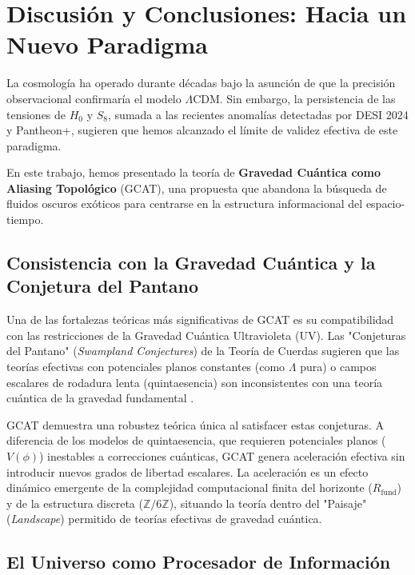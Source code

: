 \documentclass[12pt, a4paper]{article}
\theoremstyle{plain}
\theoremstyle{definition}
\begin{document}
\section{Discusión y Conclusiones: Hacia un Nuevo Paradigma}
\label{sec:conclusiones}

La cosmología ha operado durante décadas bajo la asunción de que la precisión observacional confirmaría el modelo $\Lambda$CDM. Sin embargo, la persistencia de las tensiones de $H_0$ y $S_8$, sumada a las recientes anomalías detectadas por DESI 2024 y Pantheon+, sugieren que hemos alcanzado el límite de validez efectiva de este paradigma.

En este trabajo, hemos presentado la teoría de \textbf{Gravedad Cuántica como Aliasing Topológico} (GCAT), una propuesta que abandona la búsqueda de fluidos oscuros exóticos para centrarse en la estructura informacional del espacio-tiempo.

\subsection{Consistencia con la Gravedad Cuántica y la Conjetura del Pantano}

Una de las fortalezas teóricas más significativas de GCAT es su compatibilidad con las restricciones de la Gravedad Cuántica Ultravioleta (UV). Las "Conjeturas del Pantano" (\textit{Swampland Conjectures}) de la Teoría de Cuerdas sugieren que las teorías efectivas con potenciales planos constantes (como $\Lambda$ pura) o campos escalares de rodadura lenta (quintaesencia) son inconsistentes con una teoría cuántica de la gravedad fundamental \cite{Palti2019}.

GCAT demuestra una robustez teórica única al satisfacer estas conjeturas. A diferencia de los modelos de quintaesencia, que requieren potenciales planos ($V(\phi)$) inestables a correcciones cuánticas, GCAT genera aceleración efectiva sin introducir nuevos grados de libertad escalares. La aceleración es un efecto dinámico emergente de la complejidad computacional finita del horizonte ($R_{\text{fund}}$) y de la estructura discreta ($\mathbb{Z}/6\mathbb{Z}$), situando la teoría dentro del "Paisaje" (\textit{Landscape}) permitido de teorías efectivas de gravedad cuántica.

\subsection{El Universo como Procesador de Información}
\end{document}
